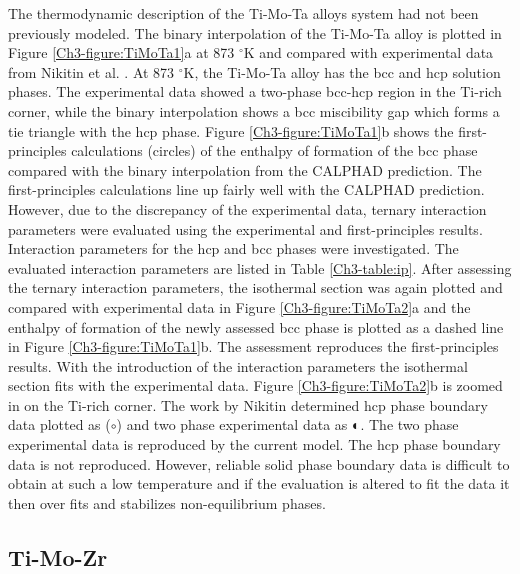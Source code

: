 The thermodynamic description of the Ti-Mo-Ta alloys system had not been previously modeled. The binary interpolation of the Ti-Mo-Ta alloy is plotted in Figure \ref{Ch3-figure:TiMoTa1}a at 873 $^\circ$K and compared with experimental data from Nikitin et al. \cite{Nikitin1971}. At 873 $^\circ$K, the Ti-Mo-Ta alloy has the bcc and hcp solution phases. The experimental data showed a two-phase bcc-hcp region in the Ti-rich corner, while the binary interpolation shows a bcc miscibility gap which forms a tie triangle with the hcp phase. Figure \ref{Ch3-figure:TiMoTa1}b shows the first-principles calculations (circles) of the enthalpy of formation of the bcc phase compared with the binary interpolation from the CALPHAD prediction. The first-principles calculations line up fairly well with the CALPHAD prediction. However, due to the discrepancy of the experimental data, ternary interaction parameters were evaluated using the experimental and first-principles results. Interaction parameters for the hcp and bcc phases were investigated. The evaluated interaction parameters are listed in Table \ref{Ch3-table:ip}. After assessing the ternary interaction parameters, the isothermal section was again plotted and compared with experimental data in Figure \ref{Ch3-figure:TiMoTa2}a and the enthalpy of formation of the newly assessed bcc phase is plotted as a dashed line in Figure \ref{Ch3-figure:TiMoTa1}b. The assessment reproduces the first-principles results. With the introduction of the interaction parameters the isothermal section fits with the experimental data. Figure \ref{Ch3-figure:TiMoTa2}b is zoomed in on the Ti-rich corner. The work by Nikitin determined hcp phase boundary data plotted as ($\circ$) and two phase experimental data as $\LEFTcircle$. The two phase experimental data is reproduced by the current model. The hcp phase boundary data is not reproduced. However, reliable solid phase boundary data is difficult to obtain at such a low temperature and if the evaluation is altered to fit the data it then over fits and stabilizes non-equilibrium phases. 

\subsection{Ti-Mo-Zr}


